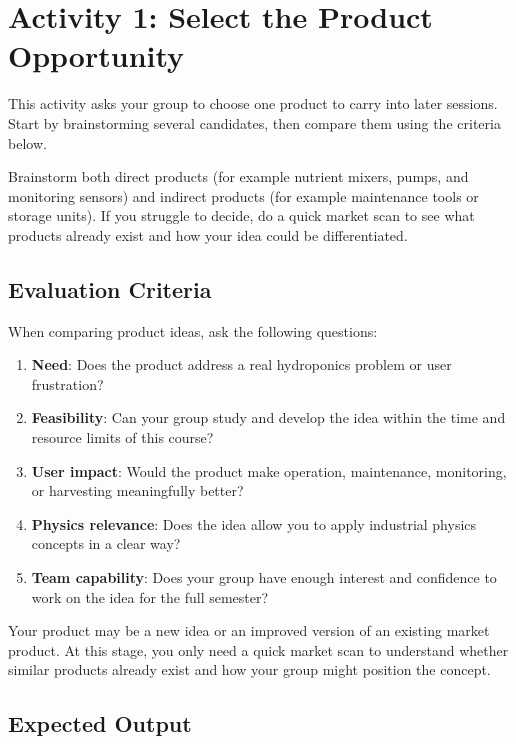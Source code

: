 \section{Activity 1: Select the Product Opportunity}

This activity asks your group to choose one product to carry into later sessions. Start by brainstorming several candidates, then compare them using the criteria below.

\begin{tcolorbox}[title=Hint]
Brainstorm both direct products (for example nutrient mixers, pumps, and monitoring sensors) and indirect products (for example maintenance tools or storage units). If you struggle to decide, do a quick market scan to see what products already exist and how your idea could be differentiated.
\end{tcolorbox}

\subsection{Evaluation Criteria}

When comparing product ideas, ask the following questions:
\begin{enumerate}
    \item \textbf{Need}: Does the product address a real hydroponics problem or user frustration?
    \item \textbf{Feasibility}: Can your group study and develop the idea within the time and resource limits of this course?
    \item \textbf{User impact}: Would the product make operation, maintenance, monitoring, or harvesting meaningfully better?
    \item \textbf{Physics relevance}: Does the idea allow you to apply industrial physics concepts in a clear way?
    \item \textbf{Team capability}: Does your group have enough interest and confidence to work on the idea for the full semester?
\end{enumerate}

Your product may be a new idea or an improved version of an existing market product. At this stage, you only need a quick market scan to understand whether similar products already exist and how your group might position the concept.

\subsection{Expected Output}

